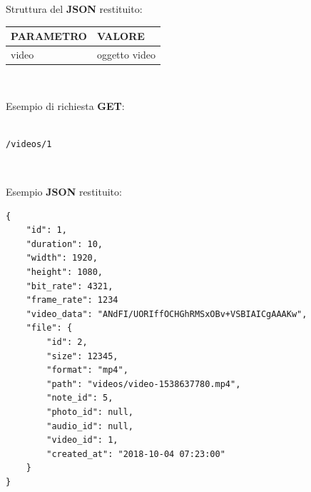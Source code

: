 \pagebreak

Struttura del \textbf{JSON} restituito:

\begin{table}[!h]
	\centering
	\begin{tabular}{@{}ll@{}}
		\toprule
		\textbf{PARAMETRO} & \textbf{VALORE}  \\ \midrule
		video              & oggetto video \\ \bottomrule
	\end{tabular}
\end{table}

\ \linebreak

Esempio di richiesta \textbf{GET}:
\begin{lstlisting}

/videos/1

\end{lstlisting}

\ \linebreak

Esempio \textbf{JSON} restituito:
\begin{lstlisting}
{
	"id": 1,
	"duration": 10,
	"width": 1920,
	"height": 1080,
	"bit_rate": 4321,
	"frame_rate": 1234
	"video_data": "ANdFI/UORIffOCHGhRMSxOBv+VSBIAICgAAAKw",
	"file": {
		"id": 2,
		"size": 12345,
		"format": "mp4",
		"path": "videos/video-1538637780.mp4",
		"note_id": 5,
		"photo_id": null,
		"audio_id": null,
		"video_id": 1,
		"created_at": "2018-10-04 07:23:00"
	}
}
\end{lstlisting}
